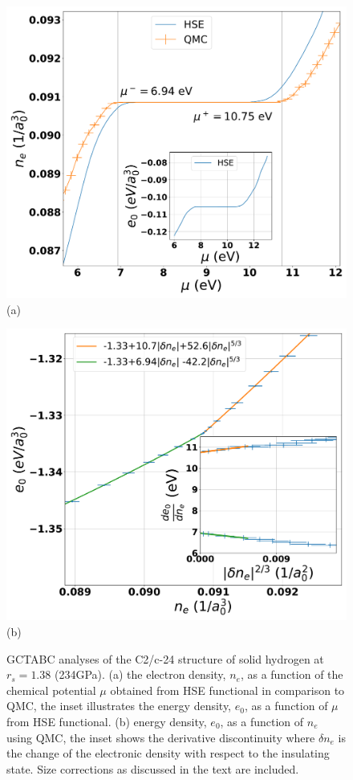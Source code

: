 \begin{figure}
\begin{minipage}[b]{0.49\columnwidth}
\includegraphics[width=\columnwidth]{DFT_RQMC_C2CP250dVs}
(a) 
\end{minipage}
\begin{minipage}[b]{0.49\columnwidth}
\includegraphics[width=\columnwidth]{RQMC_C2CP250dVs}
(b) 
\end{minipage}
\caption{GCTABC analyses of the C2/c-24 structure of solid hydrogen at $r_s=1.38$ (234GPa). (a) 
the electron density, $n_e$, as a function of the chemical potential $\mu$ obtained from HSE functional
in comparison to QMC, the inset illustrates the energy density, $e_0$, as a function of $\mu$ from HSE functional.
(b) energy density, $e_0$, as a function of $n_e$ using QMC, the inset shows the derivative discontinuity where $\delta n_e$ is the change of the electronic density with respect to the insulating state.
Size corrections as discussed in the text are included.
 \label{fig:H_C2CP250}}
\end{figure}

